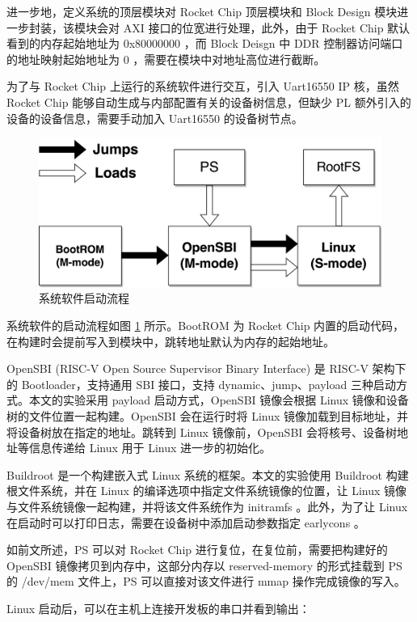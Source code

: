 进一步地，定义系统的顶层模块对 Rocket Chip 顶层模块和 Block Design 模块进一步封装，该模块会对 AXI 接口的位宽进行处理，此外，由于 Rocket Chip 默认看到的内存起始地址为 0x80000000 ，而 Block Deisgn 中 DDR 控制器访问端口的地址映射起始地址为 0 ，需要在模块中对地址高位进行截断。

为了与 Rocket Chip 上运行的系统软件进行交互，引入 Uart16550 IP 核，虽然 Rocket Chip 能够自动生成与内部配置有关的设备树信息，但缺少 PL 额外引入的设备的设备信息，需要手动加入 Uart16550 的设备树节点。

\begin{figure}
    \centering
    \includegraphics[width=0.8\linewidth]{figures/boot.png}
    \caption{系统软件启动流程}
    \label{fig:boot}
\end{figure}

系统软件的启动流程如图 \ref{fig:boot} 所示。BootROM 为 Rocket Chip 内置的启动代码，在构建时会提前写入到模块中，跳转地址默认为内存的起始地址。

OpenSBI (RISC-V Open Source Supervisor Binary Interface) \cite{opensbi} 是 RISC-V 架构下的 Bootloader，支持通用 SBI 接口，支持 dynamic、jump、payload 三种启动方式。本文的实验采用 payload 启动方式，OpenSBI 镜像会根据 Linux 镜像和设备树的文件位置一起构建。OpenSBI 会在运行时将 Linux 镜像加载到目标地址，并将设备树放在指定的地址。跳转到 Linux 镜像前，OpenSBI 会将核号、设备树地址等信息传递给 Linux 用于 Linux 进一步的初始化。

Buildroot \cite{buildroot} 是一个构建嵌入式 Linux 系统的框架。本文的实验使用 Buildroot 构建根文件系统，并在 Linux 的编译选项中指定文件系统镜像的位置，让 Linux 镜像与文件系统镜像一起构建，并将该文件系统作为 initramfs 。此外，为了让 Linux 在启动时可以打印日志，需要在设备树中添加启动参数指定 earlycons 。

如前文所述，PS 可以对 Rocket Chip 进行复位，在复位前，需要把构建好的 OpenSBI 镜像拷贝到内存中，这部分内存以 reserved-memory 的形式挂载到 PS 的 /dev/mem 文件上，PS 可以直接对该文件进行 mmap 操作完成镜像的写入。

Linux 启动后，可以在主机上连接开发板的串口并看到输出：

